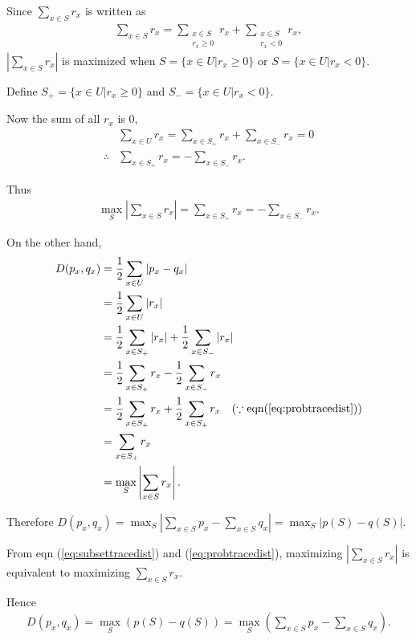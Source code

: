 Since $\sum_{x \in S} r_x $ is written as
\begin{align}
	\sum_{x \in S} r_x = \sum_{\substack{x \in S\\  r_x \geq 0}} r_x + \sum_{\substack{x \in S\\ r_x < 0}} r_x,\label{eq:subsettracedist}
\end{align}
$\left|\sum_{x \in S} r_x \right|$ is maximized when $S = \{x \in U | r_x \geq 0  \}$ or $S = \{x \in U | r_x < 0  \}$.

Define $S_+ = \{x \in U | r_x \geq 0  \}$ and $S_- = \{x \in U | r_x < 0  \}$.

Now the sum of all $r_x$ is 0,
\begin{align*}
	&\sum_{x \in U} r_x = \sum_{x \in S_+} r_x + \sum_{x \in S_-} r_x = 0\\
	\therefore &\sum_{x \in S_+} r_x = - \sum_{x \in S_-} r_x.
\end{align*}

Thus
\begin{align}
	\max_S \left|\sum_{x \in S} r_x \right| = \sum_{x \in S_+} r_x = - \sum_{x \in S_-} r_x \label{eq:probtracedist}.
\end{align}

On the other hand,
\begin{align}
	D(p_x, q_x) &= \frac{1}{2} \sum_{x \in U} |p_x - q_x|\nonumber\\
		&= \frac{1}{2} \sum_{x \in U} |r_x|\nonumber\\
		&= \frac{1}{2} \sum_{x \in S_+} |r_x| + \frac{1}{2} \sum_{x \in S_-} |r_x|\nonumber\\
		&= \frac{1}{2} \sum_{x \in S_+} r_x - \frac{1}{2} \sum_{x \in S_-} r_x\nonumber\\
		&= \frac{1}{2} \sum_{x \in S_+} r_x + \frac{1}{2} \sum_{x \in S_+} r_x ~~~(\because \text{eqn} (\ref{eq:probtracedist}))\nonumber\\
		&= \sum_{x \in S_+} r_x \nonumber\\
		&= \max_S \left|\sum_{x \in S} r_x \right|.\nonumber
\end{align}

Therefore $D(p_x, q_x) = \max_S \left|\sum_{x \in S} p_x - \sum_{x \in S}q_x \right| = \max_S |p(S) - q(S)|$.

From eqn (\ref{eq:subsettracedist}) and (\ref{eq:probtracedist}), maximizing $\left|\sum_{x \in S} r_x \right|$ is equivalent to
maximizing $\sum_{x \in S} r_x$.

Hence
\begin{align*}
	D(p_x, q_x) = \max_S (p(S) - q(S)) = \max_S \left(\sum_{x \in S} p_x - \sum_{x \in S}q_x \right).
\end{align*}



